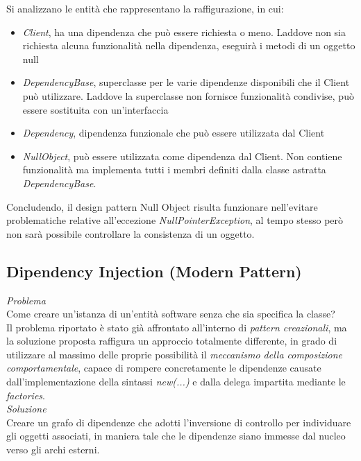 \documentclass{article}
\begin{document}
Si analizzano le entità che rappresentano la raffigurazione, in cui:
\begin{itemize}[label={-}]
    \itemsep0em
    \item \textit{Client}, ha una dipendenza che può essere richiesta o meno. Laddove non sia richiesta alcuna funzionalità nella dipendenza, eseguirà i metodi di un oggetto null
    \item \textit{DependencyBase}, superclasse per le varie dipendenze disponibili che il Client può utilizzare. Laddove la superclasse non fornisce funzionalità condivise, può essere sostituita con un'interfaccia
    \item \textit{Dependency}, dipendenza funzionale che può essere utilizzata dal Client
    \item \textit{NullObject}, può essere utilizzata come dipendenza dal Client. Non contiene funzionalità ma implementa tutti i membri definiti dalla classe astratta \textit{DependencyBase}.
\end{itemize}
Concludendo, il design pattern Null Object risulta funzionare nell'evitare problematiche relative all'eccezione \textit{NullPointerException}, al tempo stesso però non sarà possibile controllare la consistenza di un oggetto.

\subsection*{Dipendency Injection (Modern Pattern)}
\large
\textit{Problema}\\
Come creare un'istanza di un'entità software senza che sia specifica la classe?\vspace*{14pt}\\
Il problema riportato è stato già affrontato all'interno di \textit{pattern creazionali}, ma la soluzione proposta raffigura un approccio totalmente differente, in grado di utilizzare al massimo delle proprie possibilità il \textit{meccanismo della composizione comportamentale}, capace di rompere concretamente le dipendenze causate dall'implementazione della sintassi \textit{new(...)} e dalla delega impartita mediante le \textit{factories}.\vspace*{14pt}\\
\textit{Soluzione}\\
Creare un grafo di dipendenze che adotti l'inversione di controllo per individuare gli oggetti associati, in maniera tale che le dipendenze siano immesse dal nucleo verso gli archi esterni.\vspace*{14pt}\\
\end{document}
